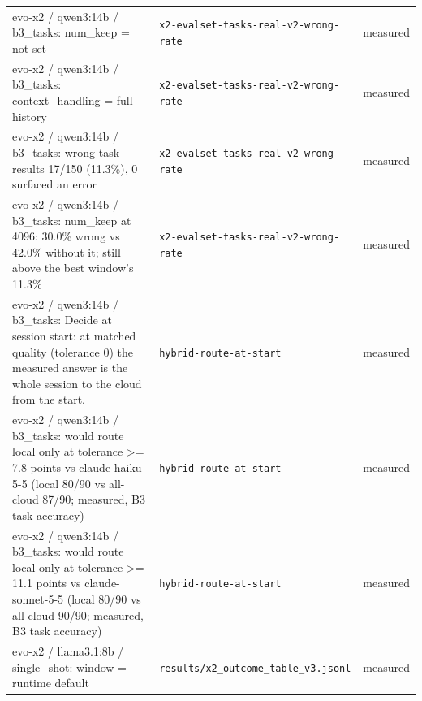 \begin{longtable}{>{\raggedright\arraybackslash}p{}>{\raggedright\arraybackslash}p{}>{\raggedright\arraybackslash}p{}}
\small evo-x2 / qwen3:14b / b3\_tasks: num\_keep = not set & {\footnotesize \texttt{x2-\allowbreak{}evalset-\allowbreak{}tasks-\allowbreak{}real-\allowbreak{}v2-\allowbreak{}wrong-\allowbreak{}rate}} & \small measured \\

\small evo-x2 / qwen3:14b / b3\_tasks: context\_handling = full history & {\footnotesize \texttt{x2-\allowbreak{}evalset-\allowbreak{}tasks-\allowbreak{}real-\allowbreak{}v2-\allowbreak{}wrong-\allowbreak{}rate}} & \small measured \\

\small evo-x2 / qwen3:14b / b3\_tasks: wrong task results 17/150 (11.3\%), 0 surfaced an error & {\footnotesize \texttt{x2-\allowbreak{}evalset-\allowbreak{}tasks-\allowbreak{}real-\allowbreak{}v2-\allowbreak{}wrong-\allowbreak{}rate}} & \small measured \\

\small evo-x2 / qwen3:14b / b3\_tasks: num\_keep at 4096: 30.0\% wrong vs 42.0\% without it; still above the best window's 11.3\% & {\footnotesize \texttt{x2-\allowbreak{}evalset-\allowbreak{}tasks-\allowbreak{}real-\allowbreak{}v2-\allowbreak{}wrong-\allowbreak{}rate}} & \small measured \\

\small evo-x2 / qwen3:14b / b3\_tasks: Decide at session start: at matched quality (tolerance 0) the measured answer is the whole session to the cloud from the start. & {\footnotesize \texttt{hybrid-\allowbreak{}route-\allowbreak{}at-\allowbreak{}start}} & \small measured \\

\small evo-x2 / qwen3:14b / b3\_tasks: would route local only at tolerance \textgreater{}= 7.8 points vs claude-haiku-5-5 (local 80/90 vs all-cloud 87/90; measured, B3 task accuracy) & {\footnotesize \texttt{hybrid-\allowbreak{}route-\allowbreak{}at-\allowbreak{}start}} & \small measured \\

\small evo-x2 / qwen3:14b / b3\_tasks: would route local only at tolerance \textgreater{}= 11.1 points vs claude-sonnet-5-5 (local 80/90 vs all-cloud 90/90; measured, B3 task accuracy) & {\footnotesize \texttt{hybrid-\allowbreak{}route-\allowbreak{}at-\allowbreak{}start}} & \small measured \\

\small evo-x2 / llama3.1:8b / single\_shot: window = runtime default & {\footnotesize \texttt{results/\allowbreak{}x2\_\allowbreak{}outcome\_\allowbreak{}table\_\allowbreak{}v3.\allowbreak{}jsonl}} & \small measured \\


\end{longtable}
